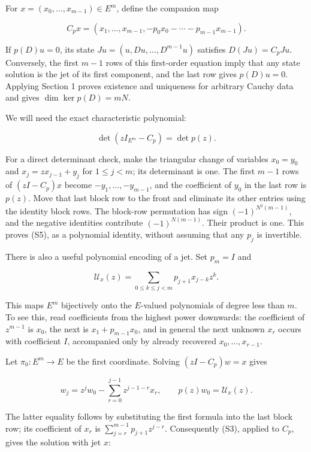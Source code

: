 \documentclass[
  11pt,
]{article}
\begin{document}
For \(x=(x_0,\ldots,x_{m-1})\in E^m\), define the companion map

\[
C_px=(x_1,\ldots,x_{m-1},-p_0x_0-\cdots-p_{m-1}x_{m-1}).
\]

If \(p(D)u=0\), its state \(J u=(u,Du,\ldots,D^{m-1}u)\) satisfies
\(D(Ju)=C_pJu\). Conversely, the first \(m-1\) rows of this first-order
equation imply that any state solution is the jet of its first
component, and the last row gives \(p(D)u=0\). Applying Section 1 proves
existence and uniqueness for arbitrary Cauchy data and gives
\(\dim\ker p(D)=mN\).

We will need the exact characteristic polynomial:

\[
\det(zI_{E^m}-C_p)=\det p(z).                              \tag{S5}
\]

For a direct determinant check, make the triangular change of variables
\(x_0=y_0\) and \(x_j=zx_{j-1}+y_j\) for \(1\leq j<m\); its determinant
is one. The first \(m-1\) rows of \((zI-C_p)x\) become
\(-y_1,\ldots,-y_{m-1}\), and the coefficient of \(y_0\) in the last row
is \(p(z)\). Move that last block row to the front and eliminate its
other entries using the identity block rows. The block-row permutation
has sign \((-1)^{N^2(m-1)}\), and the negative identities contribute
\((-1)^{N(m-1)}\). Their product is one. This proves (S5), as a
polynomial identity, without assuming that any \(p_j\) is invertible.

There is also a useful polynomial encoding of a jet. Set \(p_m=I\) and

\[
\mathcal U_x(z)=
\sum_{0\leq k\leq j<m}p_{j+1}x_{j-k}z^k.                 \tag{S6}
\]

This maps \(E^m\) bijectively onto the \(E\)-valued polynomials of
degree less than \(m\). To see this, read coefficients from the highest
power downwards: the coefficient of \(z^{m-1}\) is \(x_0\), the next is
\(x_1+p_{m-1}x_0\), and in general the next unknown \(x_r\) occurs with
coefficient \(I\), accompanied only by already recovered
\(x_0,\ldots,x_{r-1}\).

Let \(\pi_0:E^m\to E\) be the first coordinate. Solving \((zI-C_p)w=x\)
gives

\[
w_j=z^jw_0-\sum_{r=0}^{j-1}z^{j-1-r}x_r,
\qquad
p(z)w_0=\mathcal U_x(z).
\]

The latter equality follows by substituting the first formula into the
last block row; its coefficient of \(x_r\) is
\(\sum_{j=r}^{m-1}p_{j+1}z^{j-r}\). Consequently (S3), applied to
\(C_p\), gives the solution with jet \(x\):
\end{document}
